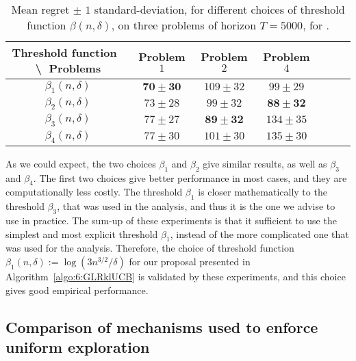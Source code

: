 \begin{small} %
\begin{table}[ht]
    \begin{small} %
    \centering
    \begin{tabular}{c|cccccc}
        \textbf{Threshold function} $\;$ \textbackslash $\;$ \textbf{Problems} & Problem $1$ & Problem $2$ & Problem $4$ \\
        \hline
        $\beta_1(n,\delta)$ & $\mathbf{70 \pm 30}$ & $109 \pm 32$ & $99 \pm 29$ \\
        $\beta_2(n,\delta)$ & $73 \pm 28$ & $99 \pm 32$ & $\mathbf{88 \pm 32}$ \\
        \hline
        $\beta_3(n,\delta)$ & $77 \pm 27$ & $\mathbf{89 \pm 32}$ & $134 \pm 35$ \\
        $\beta_4(n,\delta)$ & $77 \pm 30$ & $101 \pm 30$ & $135 \pm 30$
    \end{tabular}
    \caption{Mean regret $\pm$ $1$ standard-deviation, for different choices of threshold function $\beta(n,\delta)$, on three problems of horizon $T=5000$, for \GLRklUCB.}
    \label{table:6:exploringDifferentThresholdFunctions}
    \end{small} %
\end{table}
\end{small} %

As we could expect, the two choices $\beta_1$ and $\beta_2$ give similar results, as well as $\beta_3$ and $\beta_4$. The first two choices give better performance in most cases, and they are computationally less costly.
The threshold $\beta_1$ is closer mathematically to the threshold $\beta_3$, that was used in the analysis, and thus it is the one we advise to use in practice.
The sum-up of these experiments is that it sufficient to use the simplest and most explicit threshold $\beta_1$, instead of the more complicated one that was used for the analysis.
Therefore, the choice of threshold function $\beta_1(n, \delta) := \log\left(3 n^{3/2} / \delta\right)$ for our proposal \GLRklUCB{} presented in Algorithm~\ref{algo:6:GLRklUCB} is validated by these experiments, and this choice gives good empirical performance.


\subsection{Comparison of mechanisms used to enforce uniform exploration}\label{sec:6:exploringDifferentForcedExplorationMechanisms}

